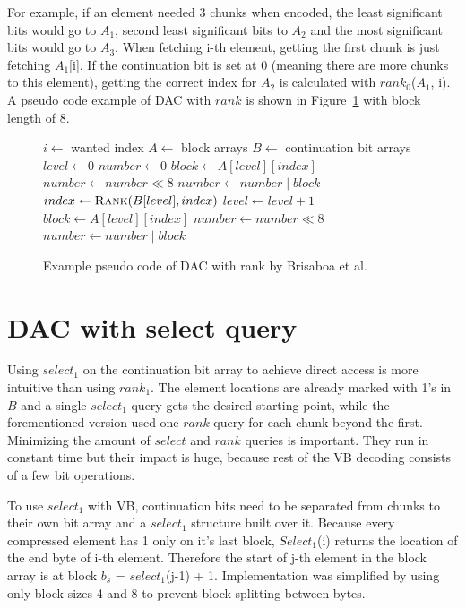 For example, if an element needed 3 chunks when encoded, the least significant bits would go to $A_1$, second least significant bits to $A_2$ and the most significant 
bits would go to $A_3$. When fetching i-th element, getting the first chunk is just fetching $A_1$[i]. If the continuation bit is set at 0 (meaning there are more chunks 
to this element), getting the correct index for $A_2$ is calculated with $rank_0$($A_1$, i). A pseudo code example of DAC with $rank$ is shown in Figure~\ref{bris_pseudo} 
with block length of 8.


\begin{figure}[ht]
\begin{algorithmic}
\State $i \gets $ wanted index
\State $A \gets $ block arrays
\State $B \gets $ continuation bit arrays
\State $level \gets 0$
\State $number \gets 0$
\State $block \gets A[level][index]$
\State $number \gets number \mathbin{\ll} 8$
\State $number \gets number \mathbin{|} block$
\State $index \gets \Call{Rank}{B[level], index}$
\State $level \gets level + 1$
\EndWhile
\State $block \gets A[level][index]$
\State $number \gets number \mathbin{\ll} 8$
\State $number \gets number \mathbin{|} block$
\end{algorithmic}
\caption{Example pseudo code of DAC with rank by Brisaboa et al.} \label{bris_pseudo}
\end{figure}


\chapter{DAC with select query}

Using $select_1$ on the continuation bit array to achieve direct access is more intuitive than using $rank_1$. The element locations are already marked with 1's 
in $B$ and a single $select_1$ query gets the desired starting point, while the forementioned version \citep{Bri09} used one $rank$ query for each chunk beyond 
the first. Minimizing the amount of $select$ and $rank$ queries is important. They run in constant time but their impact is huge, because rest of the VB decoding 
consists of a few bit operations. 

To use $select_1$ with VB, continuation bits need to be separated from chunks to their own bit array and a $select_1$ structure built over it. Because every compressed element has 1
only on it's last block, $Select_1$(i) returns the location of the end byte of i-th element. Therefore the start of j-th element in the block array is at 
block $b_s$ = $select_1$(j-1) + 1. Implementation was simplified by using only block sizes 4 and 8 to prevent block splitting between bytes.

